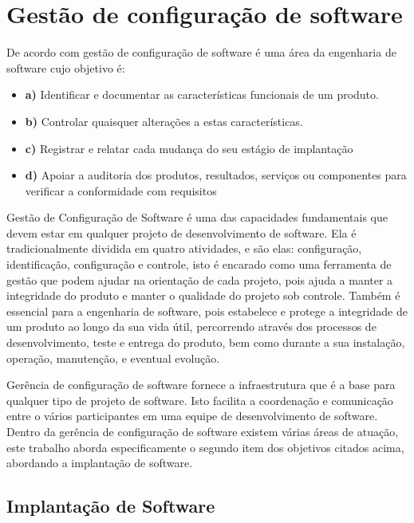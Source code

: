 \chapter{Gestão de configuração de software}
\label{cap-referencial}

De acordo com \cite{ieegcs} gestão de configuração de software é uma área da
engenharia de software cujo objetivo é:

\begin{itemize}
  \item  \textbf{a)} Identificar e documentar as características funcionais de
  um produto.
  \item  \textbf{b)} Controlar quaisquer alterações a estas características.
  \item  \textbf{c)} Registrar e relatar cada mudança do seu estágio de implantação
  \item  \textbf{d)} Apoiar a auditoria dos produtos, resultados, serviços ou
componentes para verificar a conformidade com requisitos

\end{itemize}

Gestão de Configuração de Software é uma das capacidades fundamentais que devem
estar em qualquer projeto de desenvolvimento de software. Ela é
tradicionalmente dividida em  quatro atividades, e são elas: configuração,
identificação, configuração e controle, isto é encarado como uma ferramenta de
gestão que podem ajudar na orientação de cada projeto, pois ajuda a manter a
integridade do produto e manter o qualidade do projeto sob controle.\cite{gcs}
Também é essencial para a engenharia de software, pois estabelece e protege a
integridade de um produto ao longo da sua vida útil, percorrendo através dos
processos de desenvolvimento, teste e entrega do produto, bem como
durante a sua instalação, operação, manutenção, e eventual evolução\cite{ieegcs}.

Gerência de configuração de software fornece a infraestrutura que é a base para
qualquer tipo de projeto de software. Isto facilita a coordenação e comunicação
entre o vários participantes em uma equipe de desenvolvimento de software\cite{gcs}.
Dentro da gerência de configuração de software
existem várias áreas de atuação, este trabalho aborda especificamente o segundo
item dos objetivos citados acima, abordando a implantação de software.

\section{Implantação de Software}

